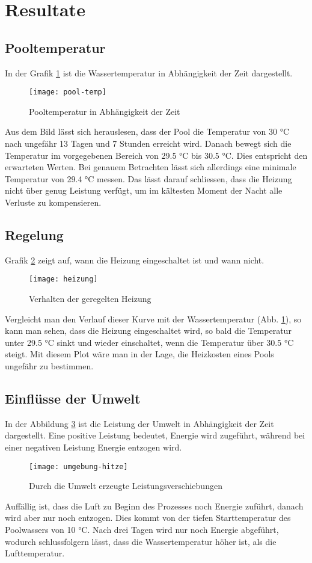 \section{Resultate}
\label{sec:Resultate}

\subsection{Pooltemperatur}
\label{subsec:Pooltemperatur}
In der Grafik \ref{fig:pool-temp} ist die Wassertemperatur in Abhängigkeit der Zeit dargestellt. 
\begin{figure}[H]
	\centering
	\texttt{[image: pool-temp]}
	\caption{Pooltemperatur in Abhängigkeit der Zeit}
	\label{fig:pool-temp}
\end{figure}
Aus dem Bild lässt sich herauslesen, dass der Pool die Temperatur von 30 °C nach ungefähr 13 Tagen und 7 Stunden erreicht wird. Danach bewegt sich die Temperatur im vorgegebenen Bereich von 29.5 °C bis 30.5 °C. Dies entspricht den erwarteten Werten. Bei genauem Betrachten lässt sich allerdings eine minimale Temperatur von 29.4 °C messen. Das lässt darauf schliessen, dass die Heizung nicht über genug Leistung verfügt, um im kältesten Moment der Nacht alle Verluste zu kompensieren.

\subsection{Regelung}
\label{subsec:Regelung}

Grafik \ref{fig:heizung} zeigt auf, wann die Heizung eingeschaltet ist und wann nicht. 
\begin{figure}[H]
	\centering
	\texttt{[image: heizung]}
	\caption{Verhalten der geregelten Heizung}
	\label{fig:heizung}
\end{figure}
Vergleicht man den Verlauf dieser Kurve mit der Wassertemperatur (Abb. \ref{fig:pool-temp}), so kann man sehen, dass die Heizung eingeschaltet wird, so bald die Temperatur unter 29.5 °C sinkt und wieder einschaltet, wenn die Temperatur über 30.5 °C steigt. Mit diesem Plot wäre man in der Lage, die Heizkosten eines Pools ungefähr zu bestimmen.

\subsection{Einflüsse der Umwelt}
\label{subsec:Einflüsse der Umwelt}
In der Abbildung \ref{fig:umgebung-hitze} ist die Leistung der Umwelt in Abhängigkeit der Zeit dargestellt. Eine positive Leistung bedeutet, Energie wird zugeführt, während bei einer negativen Leistung Energie entzogen wird. 
\begin{figure}[H]
	\centering
	\texttt{[image: umgebung-hitze]}
	\caption{Durch die Umwelt erzeugte Leistungsverschiebungen}
	\label{fig:umgebung-hitze}
\end{figure}
Auffällig ist, dass die Luft zu Beginn des Prozesses noch Energie zuführt, danach wird aber nur noch entzogen. Dies kommt von der tiefen Starttemperatur des Poolwassers von 10 °C. Nach drei Tagen wird nur noch Energie abgeführt, wodurch schlussfolgern lässt, dass die Wassertemperatur höher ist, als die Lufttemperatur. 

